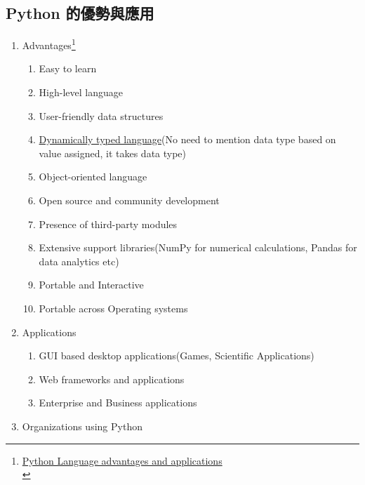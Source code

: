 \documentclass[a4paper,12pt]{article}
\begin{document}
\subsection{Python 的優勢與應用}
\label{sec:org8ce1b90}
\begin{enumerate}
\item Advantages\footnote{\href{https://www.geeksforgeeks.org/python-language-advantages-applications/}{Python Language advantages and applications}\\}
\label{sec:orgab8c618}
\begin{enumerate}
\item Easy to learn\\
\item High-level language\\
\item User-friendly data structures\\
\item \href{https://www.itread01.com/p/1441246.html}{Dynamically typed language}(No need to mention data type based on value assigned, it takes data type)\\
\item Object-oriented language\\
\item Open source and community development\\
\item Presence of third-party modules\\
\item Extensive support libraries(NumPy for numerical calculations, Pandas for data analytics etc)\\
\item Portable and Interactive\\
\item Portable across Operating systems\\
\end{enumerate}
\item Applications
\label{sec:org89c8f5e}
\begin{enumerate}
\item GUI based desktop applications(Games, Scientific Applications)\\
\item Web frameworks and applications\\
\item Enterprise and Business applications\\
\end{enumerate}
\item Organizations using Python

\end{enumerate}
\end{document}

